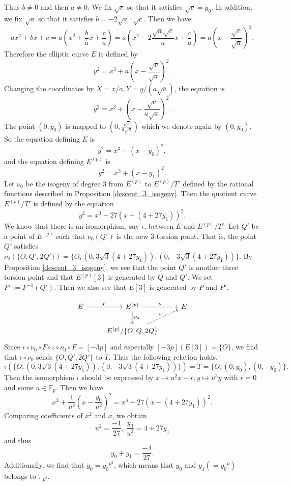 \documentclass[a4paper, 11pt]{article}
\theoremstyle{plain}
\newcommand{\?}{\textcolor{red}{??}}
\newcommand{\fp}{\mathbb{F}_p}
\newcommand{\fpp}{\mathbb{F}_{p^2}}
\begin{document}
Thus $b\neq 0$ and then $a \neq 0$. We fix $\sqrt{c} $ so that it satisfies $\sqrt{c}=y_0$. In addition, we fix $\sqrt{a}$ so that it satisfies $b=-2\sqrt{a}\cdot \sqrt{c}$. Then we have
\[
ax^2+bx+c=a\left( x^2+\frac{b}{a} x + \frac{c}{a}  \right)=a\left( x^2-2\frac{\sqrt{a}\sqrt{c}}{a} x + \frac{c}{a}  \right) =a\left( x -\frac{\sqrt{c}}{\sqrt{a}} \right)^2.
\]
Therefore the elliptic curve $E$ is defined by
\[
y^2=x^3+a\left( x -\frac{\sqrt{c}}{\sqrt{a}} \right)^2.
\]
Changing the coordinates by $X=x/a,Y=y/(a\sqrt{a})$, the equation is
\[
y^2=x^3+\left( x - \frac{\sqrt{c}}{a\sqrt{a}}\right)^2.
\]
The point $(0,y_0)$ is mapped to $(0,\frac{\sqrt{c}}{a\sqrt{a}})$ which we denote again by $(0,y_0)$. So the equation defining $E$ is
\[
y^2=x^3+(x-y_0)^2,
\]
and the equation defining $E^{(p)}$ is
\[
y^2=x^3+(x-y_1)^2.
\]
Let $\nu_0$ be the isogeny of degree $3$ from $E^{(p)}$ to $E^{(p)}/T'$ defined by the rational functions described in Proposition \ref{descent_3_isogeny}. Then the quotient curve $E^{(p)}/T'$ is defined by the equation
\[
y^2=x^3-27\left( x-(4+27y_1)\right)^2.
\]
We know that there is an isomorphism, say $\iota$, between $E$ and $E^{(p)}/T'$.  Let $Q'$ be a point of $E^{(p)}$ such that $\nu_0(Q')$ is the new $3$-torsion point.  That is, the point $Q'$ satisfies ${\nu}_0(\{O,Q',2Q'\})=\{O,(0,3\sqrt{3}(4+27y_1)),(0,-3\sqrt{3}(4+27y_1))\}$.  By Proposition \ref{descent_3_isogeny}, we see that the point $Q'$ is another three torsion point and that $E^{(p)}[3]$ is generated by $Q$ and $Q'$.  We set $P':=F^{-1}(Q')$.  Then we also see that $E[3]$ is generated by $P$ and $P'$. 

\[
\begin{tikzcd}
 E\arrow[r, "F "] & E^{(p)} \arrow[r, "\nu"] \arrow[d,"{\nu}_{0}"] & E \\
& E^{(p)} / \{O,Q,2Q\} \arrow[ur, "\iota", dashed]
\end{tikzcd}
\]
Since $\iota \circ {\nu}_0 \circ F \circ \iota \circ {\nu}_0 \circ F=[-3p] $ and especially $[-3p](E[3])=\{O\}$, we find that $\iota \circ \nu_0$ sends $\{O,Q',2Q'\}$ to $T$. Thus the following relation holds.  
\[
\iota(\{O,(0,3\sqrt{3}(4+27y_1)),(0,-3\sqrt{3}(4+27y_1))\})=T=\{O,(0,y_0),(0,-y_0)\}.
\]
Then the isomorphism $\iota$ should be expressed by $x\mapsto u^2x+r, y \mapsto u^3y$ with $r=0$ and some $u \in \overline{\fp}$. Then we have 
\[
x^3+\frac{1}{u^2}\left(x-\frac{y_0}{u^2} \right)^2=x^3-27\left(x-(4+27y_1) \right)^2.
\]
Comparing coefficients of $x^2$ and $x$, we obtain
\[
u^2=\frac{-1}{27},\ \frac{y_0}{u^2}=4+27y_1
\]
and thus
\[
y_0+y_1=\frac{-4}{27}.
\]
Additionally, we find that $y_0={y_0}^{p^2}$, which means that $y_0$ and $y_1(={y_0}^p)$ belongs to $\fpp$. 
\end{document}
